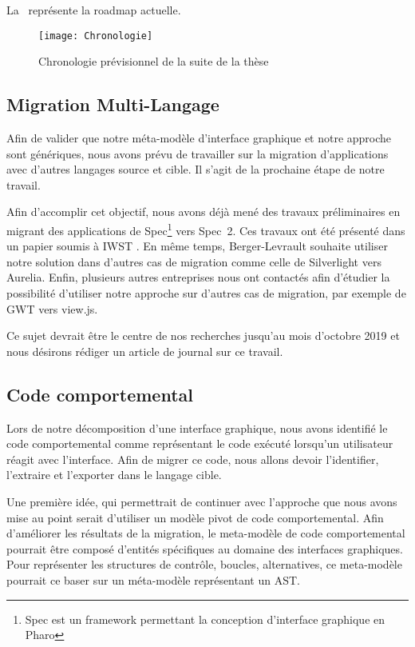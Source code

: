 \documentclass[a4paper]{article}
\begin{document}
La~ représente la roadmap actuelle.

\begin{figure}[h]
  \begin{center}
  \texttt{[image: Chronologie]}
  \caption{Chronologie prévisionnel de la suite de la thèse}
  \label{fig:chronologie}
  \end{center}
\end{figure}

\subsection{Migration Multi-Langage}
\label{sec:migrationMultiLangage}

Afin de valider que notre méta-modèle d'interface graphique et notre approche sont génériques,
  nous avons prévu de travailler sur la migration d'applications avec d'autres langages source et cible.
Il s'agit de la prochaine étape de notre travail.

Afin d'accomplir cet objectif, nous avons déjà mené des travaux préliminaires en migrant des applications de Spec\footnote{Spec est un framework permettant la conception d'interface graphique en Pharo} vers Spec~2.
Ces travaux ont été présenté dans un papier soumis à IWST \citep{Verh19d}.
En même temps, Berger-Levrault souhaite utiliser notre solution dans d'autres cas de migration comme celle de Silverlight vers Aurelia.
Enfin, plusieurs autres entreprises nous ont contactés afin d'étudier la possibilité d'utiliser notre approche sur d'autres cas de migration, par exemple de GWT vers view.js.

Ce sujet devrait être le centre de nos recherches jusqu'au mois d'octobre 2019
  et nous désirons rédiger un article de journal sur ce travail.

\subsection{Code comportemental}
\label{sec:codeComportemental}

Lors de notre décomposition d'une interface graphique, 
  nous avons identifié le code comportemental comme représentant le code exécuté lorsqu'un utilisateur réagit avec l'interface.
Afin de migrer ce code, nous allons devoir l'identifier, l'extraire et l'exporter dans le langage cible.

Une première idée, qui permettrait de continuer avec l'approche que nous avons mise au point
  serait d'utiliser un modèle pivot de code comportemental.
Afin d'améliorer les résultats de la migration,
  le meta-modèle de code comportemental pourrait être composé d'entités spécifiques au domaine des interfaces graphiques.
Pour représenter les structures de contrôle, \ie boucles, alternatives, ce meta-modèle pourrait ce baser sur un méta-modèle représentant un AST.
\end{document}
